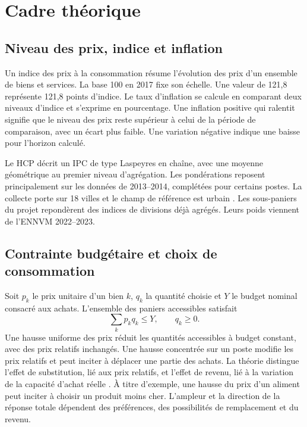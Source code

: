 \chapter{Cadre théorique}
\section{Niveau des prix, indice et inflation}
Un indice des prix à la consommation résume l'évolution des prix d'un ensemble de biens et services. La base 100 en 2017 fixe son échelle. Une valeur de 121,8 représente 121,8 points d'indice. Le taux d'inflation se calcule en comparant deux niveaux d'indice et s'exprime en pourcentage. Une inflation positive qui ralentit signifie que le niveau des prix reste supérieur à celui de la période de comparaison, avec un écart plus faible. Une variation négative indique une baisse pour l'horizon calculé.

Le HCP décrit un IPC de type Laspeyres en chaîne, avec une moyenne géométrique au premier niveau d'agrégation. Les pondérations reposent principalement sur les données de 2013--2014, complétées pour certains postes. La collecte porte sur 18 villes et le champ de référence est urbain \cite{hcpIPC,hcpNoteComplete}. Les sous-paniers du projet repondèrent des indices de divisions déjà agrégés. Leurs poids viennent de l'ENNVM 2022--2023.

\section{Contrainte budgétaire et choix de consommation}
Soit $p_k$ le prix unitaire d'un bien $k$, $q_k$ la quantité choisie et $Y$ le budget nominal consacré aux achats. L'ensemble des paniers accessibles satisfait
\[
  \sum_k p_kq_k \leq Y,\qquad q_k\geq 0.
\]
Une hausse uniforme des prix réduit les quantités accessibles à budget constant, avec des prix relatifs inchangés. Une hausse concentrée sur un poste modifie les prix relatifs et peut inciter à déplacer une partie des achats. La théorie distingue l'effet de substitution, lié aux prix relatifs, et l'effet de revenu, lié à la variation de la capacité d'achat réelle \cite{openstaxChoix}. À titre d'exemple, une hausse du prix d'un aliment peut inciter à choisir un produit moins cher. L'ampleur et la direction de la réponse totale dépendent des préférences, des possibilités de remplacement et du revenu.

